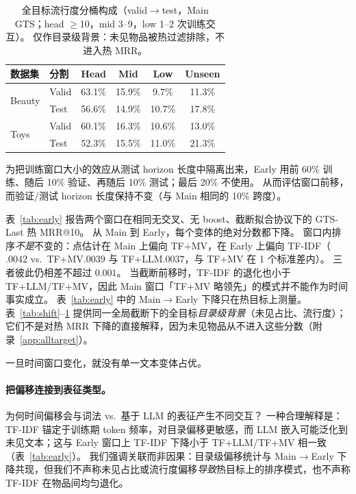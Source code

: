 \documentclass[sigconf,natbib=true,anonymous]{acmart}
\newcommand{\tfidf}{\textsc{TF-IDF}\xspace}
\newcommand{\tfllm}{\textsc{TF+LLM}\xspace}
\newcommand{\tfmv}{\textsc{TF+MV}\xspace}
\begin{document}
\begin{table}[t]
\centering
\caption{%
全目标流行度分桶构成（valid$\to$test，Main GTS；head $\ge$10，mid 3--9，low 1--2 次训练交互）。
仅作目录级背景：未见物品被热过滤排除，不进入热 MRR。%
}
\label{tab:bucket}
\small
\setlength{\tabcolsep}{3.5pt}
\begin{tabular}{@{}llcccc@{}}
\toprule
数据集 & 分割 & Head & Mid & Low & Unseen \\
\midrule
\multirow{2}{*}{Beauty}
 & Valid & 63.1\% & 15.9\% & 9.7\% & 11.3\% \\
 & Test  & 56.6\% & 14.9\% & 10.7\% & 17.8\% \\
\midrule
\multirow{2}{*}{Toys}
 & Valid & 60.1\% & 16.3\% & 10.6\% & 13.0\% \\
 & Test  & 52.3\% & 15.5\% & 11.0\% & 21.3\% \\
\bottomrule
\end{tabular}
\end{table}

为把训练窗口大小的效应从测试 horizon 长度中隔离出来，Early 用前 60\% 训练、随后 10\% 验证、再随后 10\% 测试；最后 20\% 不使用。
从而评估窗口前移，而验证/测试 horizon 长度保持不变（与 Main 相同的 10\% 跨度）。

表~\ref{tab:early} 报告两个窗口在相同无交叉、无 boost、截断拟合协议下的 GTS-Last 热 MRR@10。
从 Main 到 Early，每个变体的绝对分数都下降。
窗口内排序\emph{不是}不变的：点估计在 Main 上偏向 \tfmv，在 Early 上偏向 \tfidf（$.0042$ vs.\ \tfmv $.0039$ 与 \tfllm $.0037$，与 \tfmv 在 1 个标准差内）。
三者彼此仍相差不超过 $0.001$。
当截断前移时，\tfidf 的退化也小于 \tfllm/\tfmv，因此 Main 窗口「\tfmv 略领先」的模式并不能作为时间事实成立。
表~\ref{tab:early} 中的 Main$\to$Early 下降只在热目标上测量。
表~\ref{tab:shift}--\ref{tab:bucket} 提供同一全局截断下的全目标\emph{目录级背景}（未见占比、流行度）；它们不是对热 MRR 下降的直接解释，因为未见物品从不进入这些分数（附录~\ref{app:alltarget}）。

一旦时间窗口变化，就没有单一文本变体占优。

\paragraph{把偏移连接到表征类型。}
为何时间偏移会与词法 vs.\ 基于 LLM 的表征产生不同交互？
一种合理解释是：\tfidf 锚定于训练期 token 频率，对目录偏移更敏感，而 LLM 嵌入可能泛化到未见文本；这与 Early 窗口上 \tfidf 下降小于 \tfllm/\tfmv 相一致（表~\ref{tab:early}）。
我们强调关联而非因果：目录级偏移统计与 Main$\to$Early 下降共现，但我们不声称未见占比或流行度偏移\emph{导致}热目标上的排序模式，也不声称 TF-IDF 在物品间均匀退化。
\end{document}

